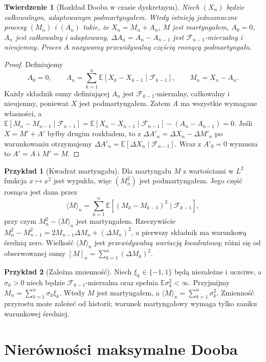 \documentclass[11pt,a4paper,oneside]{report}
\numberwithin{equation}{chapter}
\theoremstyle{plain}
\newtheorem{twierdzenie}{Twierdzenie}[chapter]
\theoremstyle{definition}
\newtheorem{przyklad}{Przykład}[chapter]
\theoremstyle{remark}
\newcommand{\E}{\mathbb{E}}
\begin{document}
\begin{twierdzenie}[Rozkład Dooba w czasie dyskretnym]
Niech $(X_n)$ będzie całkowalnym, adaptowanym
podmartyngałem. Wtedy istnieją jednoznaczne procesy
$(M_n)$ i $(A_n)$ takie, że
$X_n=M_n+A_n$, $M$ jest martyngałem,
$A_0=0$, $A_n$ jest całkowalny i adaptowany,
$\Delta A_n=A_n-A_{n-1}$ jest
$\mathcal F_{n-1}$-mierzalny i nieujemny.
Proces $A$ nazywamy przewidywalną częścią
rosnącą podmartyngału.
\end{twierdzenie}
\begin{proof}
Definiujemy
\[
A_0=0,\qquad
A_n=\sum_{k=1}^n\E[X_k-X_{k-1}\mid\mathcal F_{k-1}],
\qquad M_n=X_n-A_n.
\]
Każdy składnik sumy definiującej $A_n$ jest
$\mathcal F_{k-1}$-mierzalny, całkowalny i
nieujemny, ponieważ $X$ jest podmartyngałem.
Zatem $A$ ma wszystkie wymagane własności,
a
$\E[M_n-M_{n-1}\mid\mathcal F_{n-1}]
=\E[X_n-X_{n-1}\mid\mathcal F_{n-1}]
-(A_n-A_{n-1})=0$.
Jeśli $X=M'+A'$ byłby drugim rozkładem,
to z $\Delta A'_n=\Delta X_n-\Delta M'_n$
po warunkowaniu otrzymujemy
$\Delta A'_n=\E[\Delta X_n\mid\mathcal F_{n-1}]$.
Wraz z $A'_0=0$ wymusza to $A'=A$ i $M'=M$.
\end{proof}

\begin{przyklad}[Kwadrat martyngału]
Dla martyngału $M$ z wartościami w $L^2$ funkcja
$x\mapsto x^2$ jest wypukła, więc
$(M_n^2)$ jest podmartyngałem. Jego część rosnąca
jest dana przez
\[
\langle M\rangle_n
=\sum_{k=1}^n\E[(M_k-M_{k-1})^2\mid\mathcal F_{k-1}],
\]
przy czym $M_n^2-\langle M\rangle_n$ jest
martyngałem. Rzeczywiście
$M_n^2-M_{n-1}^2=2M_{n-1}\Delta M_n+(\Delta M_n)^2$,
a pierwszy składnik ma warunkową średnią zero.
Wielkość $\langle M\rangle_n$ jest
\emph{przewidywalną wariacją kwadratową};
różni się od obserwowanej sumy
$[M]_n=\sum_{k=1}^n(\Delta M_k)^2$.
\end{przyklad}

\begin{przyklad}[Zależna zmienność]
Niech $\xi_k\in\{-1,1\}$ będą niezależne i uczciwe,
a $\sigma_k>0$ niech będzie
$\mathcal F_{k-1}$-mierzalna oraz spełnia
$\E\sigma_k^2<\infty$. Przyjmijmy
$M_n=\sum_{k=1}^n\sigma_k\xi_k$.
Wtedy $M$ jest martyngałem, a
$\langle M\rangle_n=\sum_{k=1}^n\sigma_k^2$.
Zmienność przyrostu może zależeć od historii;
warunek martyngałowy wymaga tylko zaniku
warunkowej średniej.
\end{przyklad}

\section{Nierówności maksymalne Dooba}
\end{document}

